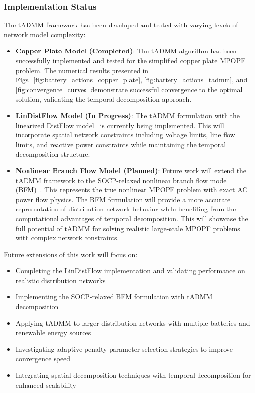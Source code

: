 \subsubsection{Implementation Status}

The tADMM framework has been developed and tested with varying levels of network model complexity:

\begin{itemize}
    \item \textbf{Copper Plate Model (Completed)}: The tADMM algorithm has been successfully implemented and tested for the simplified copper plate MPOPF problem. The numerical results presented in Figs.~\ref{fig:battery_actions_copper_plate}, \ref{fig:battery_actions_tadmm}, and \ref{fig:convergence_curves} demonstrate successful convergence to the optimal solution, validating the temporal decomposition approach.
    
    \item \textbf{LinDistFlow Model (In Progress)}: The tADMM formulation with the linearized DistFlow model~\cite{LinDistFlow} is currently being implemented. This will incorporate spatial network constraints including voltage limits, line flow limits, and reactive power constraints while maintaining the temporal decomposition structure.
    
    \item \textbf{Nonlinear Branch Flow Model (Planned)}: Future work will extend the tADMM framework to the SOCP-relaxed nonlinear branch flow model (BFM)~\cite{bfm01}. This represents the true nonlinear MPOPF problem with exact AC power flow physics. The BFM formulation will provide a more accurate representation of distribution network behavior while benefiting from the computational advantages of temporal decomposition. This will showcase the full potential of tADMM for solving realistic large-scale MPOPF problems with complex network constraints.
\end{itemize}

Future extensions of this work will focus on:
\begin{itemize}
    \item Completing the LinDistFlow implementation and validating performance on realistic distribution networks
    \item Implementing the SOCP-relaxed BFM formulation with tADMM decomposition
    \item Applying tADMM to larger distribution networks with multiple batteries and renewable energy sources
    \item Investigating adaptive penalty parameter selection strategies to improve convergence speed
    \item Integrating spatial decomposition techniques with temporal decomposition for enhanced scalability
\end{itemize}

